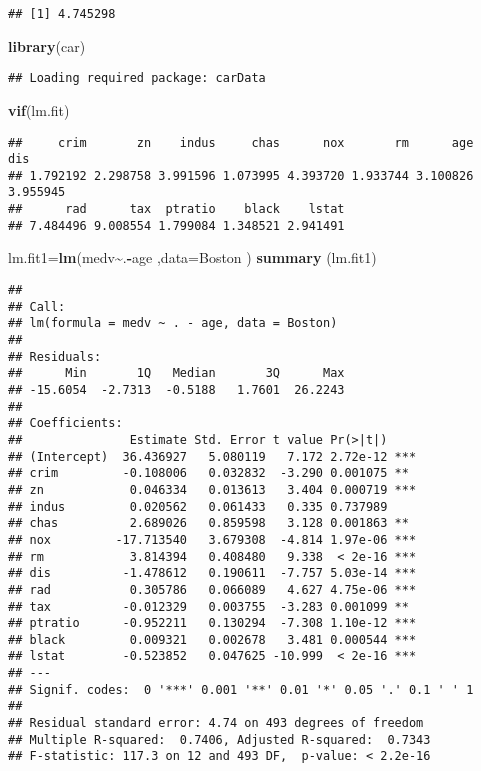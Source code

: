 \documentclass[
]{article}
\newenvironment{Shaded}{\begin{snugshade}}{\end{snugshade}}
\newcommand{\AttributeTok}[1]{\textcolor[rgb]{0.13,0.29,0.53}{#1}}
\newcommand{\FunctionTok}[1]{\textcolor[rgb]{0.13,0.29,0.53}{\textbf{#1}}}
\newcommand{\NormalTok}[1]{#1}
\newcommand{\OtherTok}[1]{\textcolor[rgb]{0.56,0.35,0.01}{#1}}
\newcommand{\SpecialCharTok}[1]{\textcolor[rgb]{0.81,0.36,0.00}{\textbf{#1}}}
\begin{document}
\begin{verbatim}
## [1] 4.745298
\end{verbatim}

\begin{Shaded}
\begin{Highlighting}[]
\FunctionTok{library}\NormalTok{(car)}
\end{Highlighting}
\end{Shaded}

\begin{verbatim}
## Loading required package: carData
\end{verbatim}

\begin{Shaded}
\begin{Highlighting}[]
\FunctionTok{vif}\NormalTok{(lm.fit)}
\end{Highlighting}
\end{Shaded}

\begin{verbatim}
##     crim       zn    indus     chas      nox       rm      age      dis 
## 1.792192 2.298758 3.991596 1.073995 4.393720 1.933744 3.100826 3.955945 
##      rad      tax  ptratio    black    lstat 
## 7.484496 9.008554 1.799084 1.348521 2.941491
\end{verbatim}

\begin{Shaded}
\begin{Highlighting}[]
\NormalTok{lm.fit1}\OtherTok{=}\FunctionTok{lm}\NormalTok{(medv}\SpecialCharTok{\textasciitilde{}}\NormalTok{.}\SpecialCharTok{{-}}\NormalTok{age ,}\AttributeTok{data=}\NormalTok{Boston )}
\FunctionTok{summary}\NormalTok{ (lm.fit1)}
\end{Highlighting}
\end{Shaded}

\begin{verbatim}
## 
## Call:
## lm(formula = medv ~ . - age, data = Boston)
## 
## Residuals:
##      Min       1Q   Median       3Q      Max 
## -15.6054  -2.7313  -0.5188   1.7601  26.2243 
## 
## Coefficients:
##               Estimate Std. Error t value Pr(>|t|)    
## (Intercept)  36.436927   5.080119   7.172 2.72e-12 ***
## crim         -0.108006   0.032832  -3.290 0.001075 ** 
## zn            0.046334   0.013613   3.404 0.000719 ***
## indus         0.020562   0.061433   0.335 0.737989    
## chas          2.689026   0.859598   3.128 0.001863 ** 
## nox         -17.713540   3.679308  -4.814 1.97e-06 ***
## rm            3.814394   0.408480   9.338  < 2e-16 ***
## dis          -1.478612   0.190611  -7.757 5.03e-14 ***
## rad           0.305786   0.066089   4.627 4.75e-06 ***
## tax          -0.012329   0.003755  -3.283 0.001099 ** 
## ptratio      -0.952211   0.130294  -7.308 1.10e-12 ***
## black         0.009321   0.002678   3.481 0.000544 ***
## lstat        -0.523852   0.047625 -10.999  < 2e-16 ***
## ---
## Signif. codes:  0 '***' 0.001 '**' 0.01 '*' 0.05 '.' 0.1 ' ' 1
## 
## Residual standard error: 4.74 on 493 degrees of freedom
## Multiple R-squared:  0.7406, Adjusted R-squared:  0.7343 
## F-statistic: 117.3 on 12 and 493 DF,  p-value: < 2.2e-16
\end{verbatim}
\end{document}
